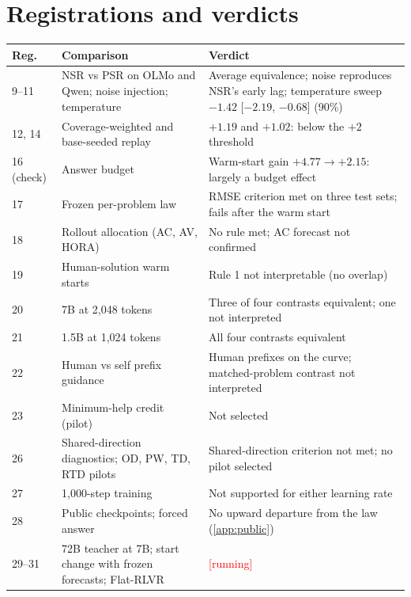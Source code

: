 \documentclass{article}
\theoremstyle{plain}
\newcommand{\pending}[1]{\textcolor{red}{[#1]}}
\begin{document}
\section{Registrations and verdicts}\label{app:prereg}
\begin{center}\small
\begin{tabular}{@{}p{}p{}p{}@{}}
\toprule
Reg. & Comparison & Verdict\\
\midrule
9--11 & NSR vs PSR on OLMo and Qwen; noise injection; temperature & Average equivalence; noise reproduces NSR's early lag; temperature sweep $-1.42$ [$-2.19$, $-0.68$] (90\%)\\
12, 14 & Coverage-weighted and base-seeded replay & $+1.19$ and $+1.02$: below the $+2$ threshold\\
16 (check) & Answer budget & Warm-start gain $+4.77\to+2.15$: largely a budget effect\\
17 & Frozen per-problem law & RMSE criterion met on three test sets; fails after the warm start\\
18 & Rollout allocation (AC, AV, HORA) & No rule met; AC forecast not confirmed\\
19 & Human-solution warm starts & Rule 1 not interpretable (no overlap)\\
20 & 7B at 2,048 tokens & Three of four contrasts equivalent; one not interpreted\\
21 & 1.5B at 1,024 tokens & All four contrasts equivalent\\
22 & Human vs self prefix guidance & Human prefixes on the curve; matched-problem contrast not interpreted\\
23 & Minimum-help credit (pilot) & Not selected\\
26 & Shared-direction diagnostics; OD, PW, TD, RTD pilots & Shared-direction criterion not met; no pilot selected\\
27 & 1,000-step training & Not supported for either learning rate\\
28 & Public checkpoints; forced answer & No upward departure from the law (\cref{app:public})\\
29--31 & 72B teacher at 7B; start change with frozen forecasts; Flat-RLVR & \pending{running}\\
\bottomrule
\end{tabular}
\end{center}
\end{document}
